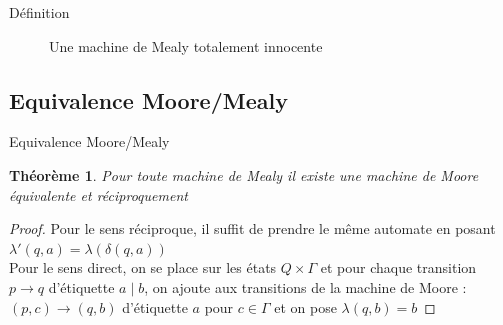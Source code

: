 \documentclass{beamer}
\newtheorem{thm}{Théorème}
\begin{document}
\begin{frame}{Définition}  
    \begin{figure}[h]
        \caption{Une machine de Mealy totalement innocente}
        \begin{center}
        \end{center}
    \end{figure}
\end{frame}

\subsection{Equivalence Moore/Mealy}

\begin{frame}{Equivalence Moore/Mealy}
    \begin{thm}
        Pour toute machine de Mealy il existe une machine de Moore équivalente et réciproquement
    \end{thm}

    \begin{proof}
        Pour le sens réciproque, il suffit de prendre le même automate en posant $\lambda'(q, a) = \lambda(\delta(q, a))$\\
        Pour le sens direct, on se place sur les états $Q \times \Gamma$ et pour chaque transition $p \rightarrow q$
        d'étiquette $a \mid b$, on ajoute aux transitions de la machine de Moore : $(p, c) \rightarrow (q, b)$ d'étiquette $a$ pour $c \in \Gamma$
        et on pose $\lambda(q, b) = b$ 
    \end{proof}
\end{frame}
\end{document}
